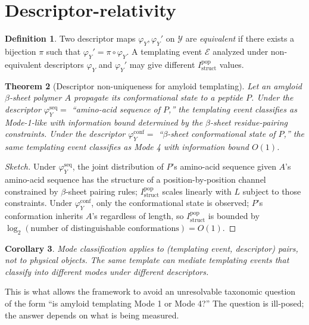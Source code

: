 \documentclass[11pt]{article}
\theoremstyle{plain}
\newtheorem{theorem}{Theorem}
\newtheorem{corollary}[theorem]{Corollary}
\theoremstyle{definition}
\newtheorem{definition}[theorem]{Definition}
\newcommand{\Istructpop}{I_{\mathrm{struct}}^{\mathrm{pop}}}
\newcommand{\descY}{\varphi_Y}
\begin{document}
\section{Descriptor-relativity}
\label{sec:descriptor}

\begin{definition}
Two descriptor maps $\descY, \descY'$ on $\mathcal{Y}$ are \emph{equivalent} if there exists a bijection $\pi$ such that $\descY' = \pi \circ \descY$. A templating event $\mathcal{E}$ analyzed under non-equivalent descriptors $\descY$ and $\descY'$ may give different $\Istructpop$ values.
\end{definition}

\begin{theorem}[Descriptor non-uniqueness for amyloid templating]
\label{thm:amyloid}
Let an amyloid $\beta$-sheet polymer $A$ propagate its conformational state to a peptide $P$. Under the descriptor $\descY^{\mathrm{seq}} = $ ``amino-acid sequence of $P$,'' the templating event classifies as Mode-1-like with information bound determined by the $\beta$-sheet residue-pairing constraints. Under the descriptor $\descY^{\mathrm{conf}} = $ ``$\beta$-sheet conformational state of $P$,'' the same templating event classifies as Mode 4 with information bound $O(1)$.
\end{theorem}

\begin{proof}[Sketch]
Under $\descY^{\mathrm{seq}}$, the joint distribution of $P$'s amino-acid sequence given $A$'s amino-acid sequence has the structure of a position-by-position channel constrained by $\beta$-sheet pairing rules; $\Istructpop$ scales linearly with $L$ subject to those constraints. Under $\descY^{\mathrm{conf}}$, only the conformational state is observed; $P$'s conformation inherits $A$'s regardless of length, so $\Istructpop$ is bounded by $\log_2(\text{number of distinguishable conformations}) = O(1)$.
\end{proof}

\begin{corollary}
Mode classification applies to (templating event, descriptor) pairs, not to physical objects. The same template can mediate templating events that classify into different modes under different descriptors.
\end{corollary}

This is what allows the framework to avoid an unresolvable taxonomic question of the form ``is amyloid templating Mode 1 or Mode 4?'' The question is ill-posed; the answer depends on what is being measured.
\end{document}
